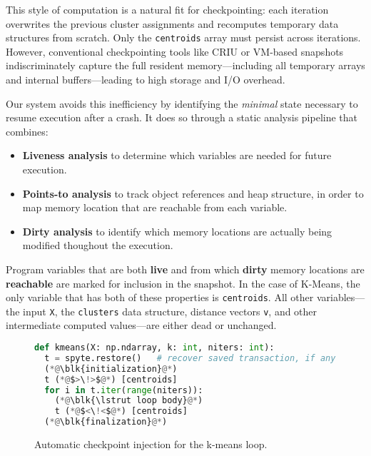 This style of computation is a natural fit for checkpointing: each iteration overwrites the previous cluster assignments and recomputes temporary data structures from scratch. Only the \texttt{centroids} array must persist across iterations. However, conventional checkpointing tools like CRIU or VM-based snapshots indiscriminately capture the full resident memory---including all temporary arrays and internal buffers---leading to high storage and I/O overhead.

Our system avoids this inefficiency by identifying the \emph{minimal} state necessary to resume execution after a crash. It does so through a static analysis pipeline that combines:
\begin{itemize}
    \item \textbf{Liveness analysis} to determine which variables are needed for future execution.
    \item \textbf{Points-to analysis} to track object references and heap structure, in order to map memory
location that are reachable from each variable.
    \item \textbf{Dirty analysis} to identify which memory locations are actually being modified thoughout the execution.
\end{itemize}

Program variables that are both \textbf{live} and from which \textbf{dirty} memory locations are \textbf{reachable}
are marked for inclusion in the snapshot.
In the case of K-Means, the only variable that has both of these properties is \lstinline|centroids|.
All other variables---the input \lstinline|X|, the \lstinline|clusters| data structure, distance vectors \lstinline|v|, and other intermediate computed values---are either dead or unchanged.

\begin{figure}[t]
\newcommand\blk[1]{%
  \tikz[baseline=(a.base)]
  \node(a)[draw, dashed, dash pattern=on 2pt off 1pt, minimum height=15pt] {\# #1}; }
\newcommand\lstrut{%
  \rule[-.3\baselineskip]{0pt}{1.1\baselineskip}}
\centering
\begin{lstlisting}[language=python]
def kmeans(X: np.ndarray, k: int, niters: int):
  t = spyte.restore()   # recover saved transaction, if any
  (*@\blk{initialization}@*)
  t (*@$>\!>$@*) [centroids]
  for i in t.iter(range(niters)):
    (*@\blk{\lstrut loop body}@*)
    t (*@$<\!<$@*) [centroids]
  (*@\blk{finalization}@*)
\end{lstlisting}
\caption{Automatic checkpoint injection for the k-means loop.}
\label{fig:checkpoint-injection}
\end{figure}

